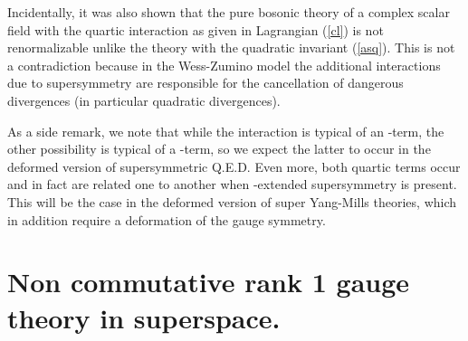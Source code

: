 \documentclass[a4paper,12pt]{article}
\begin{document}
Incidentally, it was also  shown that the pure bosonic theory of a complex
 scalar field \coordHE{} with the quartic
interaction as given in Lagrangian (\ref{cl}) is not renormalizable unlike
the theory
with the quadratic invariant (\ref{asq}). This is not a contradiction
because in the Wess-Zumino model the additional interactions due to
supersymmetry are
 responsible for the cancellation of dangerous divergences (in particular
quadratic divergences).

As a side remark, we note that while the interaction \coordHE{} is
typical of an \coordHE{}-term, the other possibility \coordHE{} is typical
 of a \coordHE{}-term, so we expect the latter to occur in the deformed version
of supersymmetric Q.E.D.
Even more, both quartic terms occur and in fact are related one to another
when \coordHE{}-extended
supersymmetry is present. This will be the case in the deformed version of
\coordHE{} super
 Yang-Mills theories, which in addition require a deformation of the gauge
symmetry.



\section{Non commutative rank 1 gauge theory in superspace.}
\end{document}
